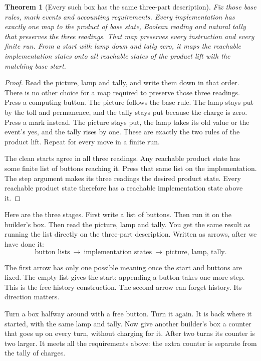 \documentclass[11pt,twoside]{article}
\theoremstyle{thielethm}
\newtheorem{theorem}{Theorem}[section]
\theoremstyle{thieledef}
\theoremstyle{thieledef}
\theoremstyle{thieledef}
\theoremstyle{thielethm}
\theoremstyle{thieleobs}
\theoremstyle{thielethm}
\begin{document}
\begin{theorem}[Every such box has the same three-part description]\label{thm:lift-terminal}
Fix those base rules, mark events and accounting requirements. Every
implementation has exactly one map to the product of base state, Boolean
reading and natural tally that preserves the three readings. That map
preserves every instruction and every finite run. From a start with lamp
down and tally zero, it maps the reachable implementation states onto all
reachable states of the product lift with the matching base start.
\end{theorem}
\begin{proof}
Read the picture, lamp and tally, and write them down in that order. There
is no other choice for a map required to preserve those three readings.
Press a computing button. The picture follows the base rule. The lamp stays
put by the toll and permanence, and the tally stays put because the charge
is zero. Press a mark instead. The picture stays put, the lamp takes its old
value or the event's yes, and the tally rises by one. These are exactly the
two rules of the product lift. Repeat for every move in a finite run.

The clean starts agree in all three readings. Any reachable product state
has some finite list of buttons reaching it. Press that same list on the
implementation. The step argument makes its three readings the desired
product state. Every reachable product state therefore has a reachable
implementation state above it.
\end{proof}

Here are the three stages. First write a list of buttons. Then run it on
the builder's box. Then read the picture, lamp and tally. You get the same
result as running the list directly on the three-part description. Written
as arrows, after we have done it:
\[
\text{button lists}\ \longrightarrow\ \text{implementation states}
\ \longrightarrow\ \text{picture, lamp, tally}.
\]

The first arrow has only one possible meaning once the start and buttons
are fixed. The empty list gives the start; appending a button takes one
more step. This is the free history construction. The second arrow can
forget history. Its direction matters.

Turn a box halfway around with a free button. Turn it again. It is back
where it started, with the same lamp and tally. Now give another builder's
box a counter that goes up on every turn, without charging for it. After
two turns its counter is two larger. It meets all the requirements above:
the extra counter is separate from the tally of charges.
\end{document}
